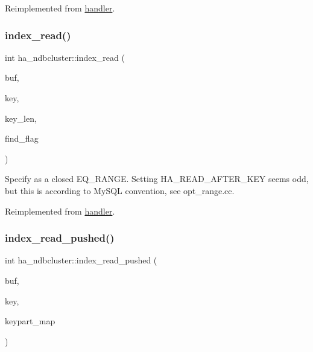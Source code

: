 Reimplemented from \mbox{\hyperlink{classhandler_a1ab892ae78db6437119d2d25621118b7}{handler}}.

\mbox{\label{classha__ndbcluster_a0fc1fdfefdf8315fca2ebac5ad296e08}} 
\subsubsection{\texorpdfstring{index\+\_\+read()}{index\_read()}}
{\footnotesize\ttfamily int ha\+\_\+ndbcluster\+::index\+\_\+read (\begin{DoxyParamCaption}\item[{uchar $\ast$}]{buf,  }\item[{const uchar $\ast$}]{key,  }\item[{uint}]{key\+\_\+len,  }\item[{enum ha\+\_\+rkey\+\_\+function}]{find\+\_\+flag }\end{DoxyParamCaption})\hspace{0.3cm}{\ttfamily [virtual]}}

Specify as a closed E\+Q\+\_\+\+R\+A\+N\+GE. Setting H\+A\+\_\+\+R\+E\+A\+D\+\_\+\+A\+F\+T\+E\+R\+\_\+\+K\+EY seems odd, but this is according to My\+S\+QL convention, see opt\+\_\+range.\+cc.

Reimplemented from \mbox{\hyperlink{classhandler}{handler}}.

\mbox{\label{classha__ndbcluster_aa7c34f1ba38d98ac501de119c7933dce}} 
\subsubsection{\texorpdfstring{index\+\_\+read\+\_\+pushed()}{index\_read\_pushed()}}
{\footnotesize\ttfamily int ha\+\_\+ndbcluster\+::index\+\_\+read\+\_\+pushed (\begin{DoxyParamCaption}\item[{uchar $\ast$}]{buf,  }\item[{const uchar $\ast$}]{key,  }\item[{key\+\_\+part\+\_\+map}]{keypart\+\_\+map }\end{DoxyParamCaption})\hspace{0.3cm}{\ttfamily [virtual]}}


